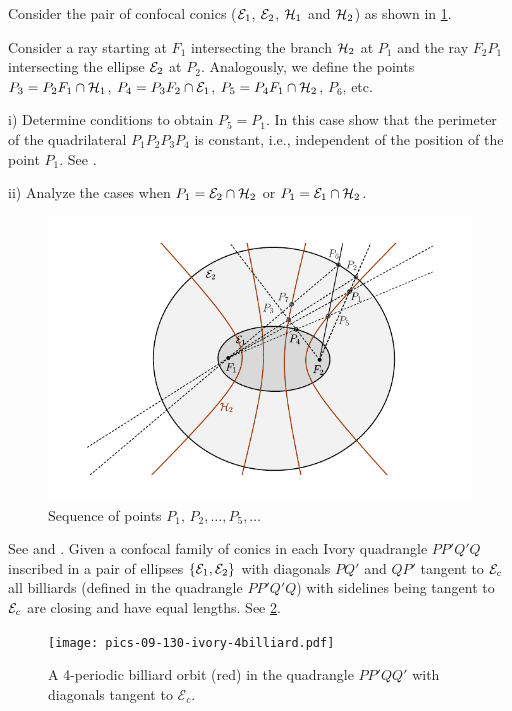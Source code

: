 


\begin{exercise}
\label{exerc:08-02-periodicsequence}
Consider the pair of confocal conics ($\mathcal{E}_1$, $\mathcal{E}_2$, $\mathcal{H}_1$ and $\mathcal{H}_2$) as shown in  \cref{fig:retangulo_exerc82}.

  Consider a ray starting at $F_1$ intersecting the branch $\mathcal{H}_2$ at $P_1$ and  the ray
  $F_2P_1$  intersecting the ellipse $\mathcal{E}_2$  at $P_2$. Analogously, we define the points $P_3=P_2F_1\cap\mathcal{H}_1$, $P_4=P_3F_2\cap\mathcal{E}_1$, $P_5=P_4F_1\cap\mathcal{H}_2$,
  $P_6$, etc.  
  
\noindent i) Determine conditions to obtain $P_5=P_1$. 
In this case show that the perimeter of the quadrilateral
$P_1P_2P_3P_4$ is constant, i.e., independent of the position of the point $P_1$.  See \cite{dolgirev2014}.


\noindent ii) Analyze the cases when $P_1=\mathcal{E}_2\cap \mathcal{H}_2$ or $P_1=\mathcal{E}_1\cap \mathcal{H}_2$.

 \begin{figure}[H]
 	\begin{center}
 	 \includegraphics[scale=1]{chap_09/pics/pics_09_910_dinamica_retangulos.pdf}
 		\caption {Sequence of points $P_1,  \,P_2, \ldots,  P_5 ,  \ldots$  
 		 \label{fig:retangulo_exerc82} }
 	\end{center}
 	\end{figure}
 	
 	\end{exercise}
 	
 	
\begin{exercise} See \cite{izmestiev2017-ivory} and \cite{stachel-ivory-2019}.
   Given a confocal family of conics   in each Ivory quadrangle $PP'Q'Q$ inscribed in a pair of ellipses $\{\mathcal{E}_1,\mathcal{E}_2\}$
with diagonals $PQ'$ and $QP'$ tangent to  $\mathcal{E}_c$ all billiards (defined in the quadrangle $PP'Q'Q$) with sidelines
being tangent to $\mathcal{E}_c$ are closing and have equal lengths. See \cref{fig:09-ivory-4billiard}.
\begin{figure}
    \centering
    \texttt{[image: pics-09-130-ivory-4billiard.pdf]}
    \caption{A 4-periodic billiard orbit (red) in the quadrangle $PP'QQ'$ with diagonals tangent to $\mathcal{E}_c$.}
    \label{fig:09-ivory-4billiard}
\end{figure}
\end{exercise}